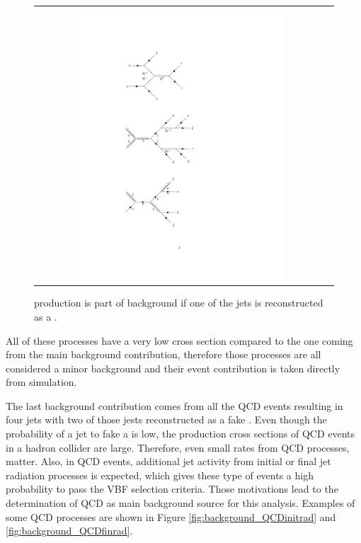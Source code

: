 \begin{figure}[tbh!]
	\centering
	\begin{tabular}{cc}
		\includegraphics[width=0.75\textwidth]{diagrams/pics/background_ttbar.pdf}
	\end{tabular}
	\caption{\ttbar production is part of background if one of the jets is reconstructed as a \hadtau.}
	\label{fig:background_ttbar}
\end{figure}

All of these processes have a very low cross section compared to the one coming from the main background contribution, therefore those processes are all considered a minor background and their event contribution is taken directly from simulation.

The last background contribution comes from all the QCD events resulting in four jets with two of those jests reconstructed as a fake \hadtau. Even though the probability of a jet to fake a \hadtau is low, the production cross sections of QCD events in a hadron collider are large. Therefore, even small \hadtaufake rates from QCD processes, matter. Also, in QCD events, additional jet activity from initial or final jet radiation processes is expected, which gives these type of events a high probability to pass the VBF selection criteria. Those motivations lead to the determination of QCD as main background source for this analysis. Examples of some QCD processes are shown in Figure \ref{fig:background_QCDinitrad} and \ref{fig:background_QCDfinrad}.


